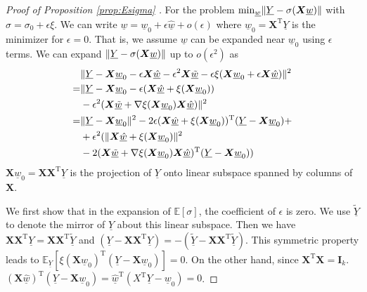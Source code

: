 \documentclass[conference,letterpaper]{IEEEtran}
\DeclarePairedDelimiter\norm{\lVert}{\rVert}
\def\E{\mathbb{E}}
\def\T{\mathrm{T}}
\begin{document}
\begin{proof}[Proof of Proposition \ref{prop:Esigma} ]
For the problem $\min_{\underline{w}} \norm{\underline{Y} - \sigma(\bm{X} \underline{w})}$
with $\sigma = \sigma_0 + \epsilon \xi$. We can write $\underline{w} = \underline{w}_0
+ \epsilon \underline{\hat{w}} + o(\epsilon)$ where $\underline{w}_0 = \bm{X}^\T \underline{Y}$ is the minimizer for
$\epsilon = 0$. That is, we assume $\underline{w}$ can be expanded near $\underline{w}_0$
using $\epsilon$ terms. We can expand $\norm{\underline{Y} - \sigma(\bm{X} \underline{w})}$ 
up to $o(\epsilon^2)$ as
\begin{align*}
&\norm{\underline{Y} - \bm{X} \underline{w}_0 - \epsilon \bm{X} \underline{\hat{w}} -
\epsilon^2 \bm{X} \underline{\tilde{w}} - \epsilon \xi(\bm{X} \underline{w}_0 +
\epsilon \bm{X} \underline{\hat{w}}) }^2 \\
= & \norm{ \underline{Y} - \bm{X}  \underline{w}_0 -
\epsilon (\bm{X}\underline{\hat{w}} + \xi(\bm{X} \underline{w}_0 )) \\
&-  \epsilon^2(\bm{X}\underline{\tilde{w}} + \nabla \xi(\bm{X} \underline{w}_0 )\bm{X}\underline{\hat{w}})}^2 \\
= & \norm{\underline{Y}-\bm{X} \underline{w}_0  }^2 -
2 \epsilon (\bm{X} \underline{\hat{w}} +
\xi(\bm{X} \underline{w}_0))^\T (\underline{Y} - \bm{X} \underline{w}_0) +\\
& +  \epsilon^2(\norm{\bm{X}\underline{\hat{w}} + \xi(\bm{X} \underline{w}_0)}^2 \\
& -
2 (\bm{X} \underline{\tilde{w}}+
\nabla \xi(\bm{X} \underline{w}_0)\bm{X}\underline{\hat{w}})^\T(\underline{Y}-\bm{X} \underline{w}_0))
\end{align*}
$\bm{X}\underline{w}_0 = \bm{X}\bm{X}^\T \underline{Y}$ is the projection of $\underline{Y}$ onto linear subspace spanned by
columns of $\bm{X}$.

We first show that in the expansion of $\E[\sigma]$, the coefficient of $\epsilon$ is zero.
We use $\tilde{\underline{Y}}$ to denote the mirror of $\underline{Y}$ about this linear subspace.
Then we have
$\bm{X}\bm{X}^\T \underline{Y} = \bm{X}\bm{X}^\T \tilde{\underline{Y}}$ and
$(\underline{Y}- \bm{X}\bm{X}^\T\underline{Y}) = -(\tilde{\underline{Y}} - \bm{X}\bm{X}^\T \tilde{\underline{Y}})$.
This symmetric property leads to $\E_{\underline{Y}}[\xi(\bm{X}\underline{w}_0)^\T (\underline{Y}-\bm{X}\underline{w}_0)]=0$.
On the other hand, since $\bm{X}^\T \bm{X} = \mathbf{I}_k$. $(\bm{X}\underline{\hat{w}})^\T (\underline{Y}-\bm{X}\underline{w}_0) = \underline{\hat{w}}^\T (X^\T \underline{Y} - \underline{w}_0) = 0$.


\end{proof}
\end{document}
